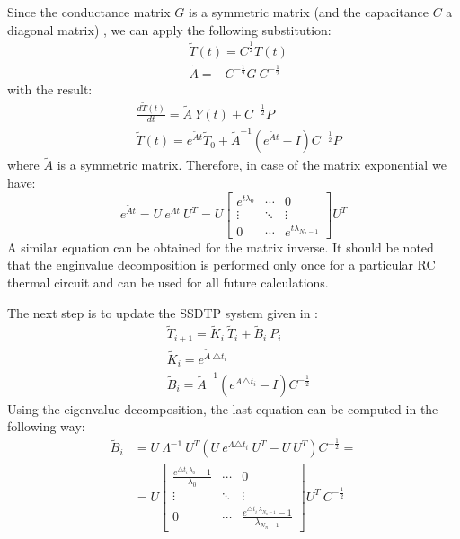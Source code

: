 Since the conductance matrix $G$ is a symmetric matrix (and the capacitance $C$ a diagonal matrix) \cite{rao2007}, we can apply the following substitution:
\begin{align*}
  & \tilde{T}(t) = C^{\frac{1}{2}} T(t) \\
  & \tilde{A} = -C^{-\frac{1}{2}} G \: C^{-\frac{1}{2}}
\end{align*}
with the result:
\begin{align*}
  & \frac{d\tilde{T}(t)}{dt} = \tilde{A} \: Y(t) + C^{-\frac{1}{2}} P \\
  & \tilde{T}(t) = e^{\tilde{A} t} \tilde{T}_0 + \tilde{A}^{-1} (e^{\tilde{A} t} - I) C^{-\frac{1}{2}} P
\end{align*}
where $\tilde{A}$ is a symmetric matrix. Therefore, in case of the matrix exponential we have:
\[
  e^{\tilde{A} t} = U \: e^{\Lambda t} \: U^T = U \left[
      \begin{array}{ccc}
        e^{t \lambda_0} & \cdots & 0 \\
        \vdots & \ddots & \vdots \\
        0 & \cdots & e^{t \lambda_{N_n - 1}}
      \end{array}
    \right] U^T
\]
A similar equation can be obtained for the matrix inverse. It should be noted that the enginvalue decomposition is performed only once for a particular RC thermal circuit and can be used for all future calculations.

The next step is to update the SSDTP system given in :
\begin{align}
  & \tilde{T}_{i+1} = \tilde{K}_i \: \tilde{T}_i + \tilde{B}_i \: P_i \label{eq:recurrent-equation} \\
  & \tilde{K}_i = e^{\tilde{A} \: \triangle t_i} \nonumber \\
  & \tilde{B}_i = \tilde{A}^{-1} \left( e^{\tilde{A} \triangle t_i} - I \right) C^{-\frac{1}{2}} \nonumber
\end{align}
Using the eigenvalue decomposition, the last equation can be computed in the following way:
\begin{align*}
  \tilde{B}_i & = U \: \Lambda^{-1} \: U^T \left(U \: e^{\Lambda \triangle t_i} \: U^T - U \: U^T \right) C^{-\frac{1}{2}} = \\
      & = U \left[
        \begin{array}{ccc}
          \frac{e^{\triangle t_i \: \lambda_0} - 1}{\lambda_0} & \cdots & 0 \\
          \vdots & \ddots & \vdots \\
          0 & \cdots & \frac{e^{\triangle t_i \: \lambda_{N_n - 1}} - 1}{\lambda_{N_n - 1}}
        \end{array}
      \right] U^T \: C^{-\frac{1}{2}}
\end{align*}


